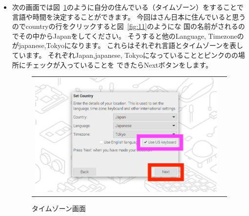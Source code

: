  \begin{itemize}
    \item 次の画面では図~\ref{fig:10}のように自分の住んでいる（タイムゾーン）をすることで
    言語や時間を決定することができます。
    今回はさん日本に住んでいると思うのでcountryの行をクリックすると図~\ref{fig:11}のようにな
    国の名前がされるのでその中からJapanをしてください。
    そうすると他のLanguage, Timezoneのがjapanese,Tokyoになります。
    これらはそれぞれ言語とタイムゾーンを表しています。
    それぞれJapan,japanese, Tokyoになっていることとピンクのの場所にチェックが入っていることを
    できたらNextボタンをします。
  
    \begin{figure}[h]
      \centering
      \begin{tabular}{cc}
        \centering
        \begin{minipage}{0.45\textwidth}
          \centering
          \includegraphics[width=\linewidth]{text01-img/sw_image02.png}
          \caption{タイムゾーン画面}\label{fig:10}
        \end{minipage}


\end{tabular}
\end{figure}
\end{itemize}
